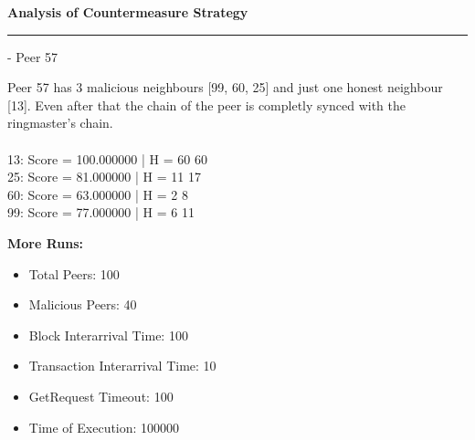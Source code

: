 \documentclass[a4paper,12pt]{article}
\newenvironment{solution}[2][]{%
\begin{mdframed}[linecolor=blue!70!black, linewidth=2pt, roundcorner=10pt, backgroundcolor=yellow!10!white, skipabove=12pt, skipbelow=12pt]%
	\textbf{\large #2}
	\par\noindent\rule{\textwidth}{0.4pt}
}{
\end{mdframed}
}
\begin{document}
\begin{solution}{Analysis of Countermeasure Strategy}
- Peer 57
\begin{figure}[H]
	\centering
\end{figure}
Peer 57 has 3 malicious neighbours [99, 60, 25] and just one honest neighbour [13]. Even after that the chain of the peer is completly synced with the ringmaster's chain.\\\\
13: Score = 100.000000 | H = 60 60\\
25: Score = 81.000000 | H = 11 17\\
60: Score = 63.000000 | H = 2 8\\
99: Score = 77.000000 | H = 6 11

\begin{figure}[H]
	\centering
\end{figure}

\textbf{More Runs:}
\begin{itemize}
	\vspace{-7pt}
	\item Total Peers: 100
	\vspace{-7pt}
	\item Malicious Peers: 40
	\vspace{-7pt}
	\item Block Interarrival Time: 100
	\vspace{-7pt}
	\item Transaction Interarrival Time: 10
	\vspace{-7pt}
	\item GetRequest Timeout: 100 
	\vspace{-7pt}
	\item Time of Execution: 100000
\end{itemize}


\end{solution}
\end{document}
